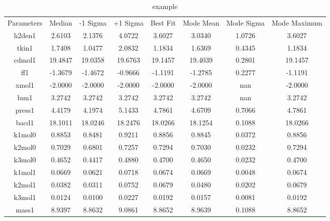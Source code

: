 \begin{table}
\caption{example}
\begin{tabular}{cccccccc}
Parameters & Median & -1 Sigma & +1 Sigma & Best Fit & Mode Mean & Mode Sigma & Mode Maximum \\
h2den1 & 2.6103 & 2.1376 & 4.0722 & 3.6027 & 3.0340 & 1.0726 & 3.6027 \\
tkin1 & 1.7408 & 1.0477 & 2.0832 & 1.1834 & 1.6369 & 0.4345 & 1.1834 \\
cdmol1 & 19.4847 & 19.0358 & 19.6763 & 19.1457 & 19.4039 & 0.2801 & 19.1457 \\
ff1 & -1.3679 & -1.4672 & -0.9666 & -1.1191 & -1.2785 & 0.2277 & -1.1191 \\
xmol1 & -2.0000 & -2.0000 & -2.0000 & -2.0000 & -2.0000 & nan & -2.0000 \\
lum1 & 3.2742 & 3.2742 & 3.2742 & 3.2742 & 3.2742 & nan & 3.2742 \\
press1 & 4.4179 & 4.1974 & 5.1433 & 4.7861 & 4.6709 & 0.7066 & 4.7861 \\
bacd1 & 18.1011 & 18.0246 & 18.2476 & 18.0266 & 18.1254 & 0.1088 & 18.0266 \\
k1mol0 & 0.8853 & 0.8481 & 0.9211 & 0.8856 & 0.8845 & 0.0372 & 0.8856 \\
k2mol0 & 0.7029 & 0.6801 & 0.7257 & 0.7294 & 0.7030 & 0.0232 & 0.7294 \\
k3mol0 & 0.4652 & 0.4417 & 0.4880 & 0.4700 & 0.4650 & 0.0232 & 0.4700 \\
k1mol1 & 0.0669 & 0.0621 & 0.0718 & 0.0674 & 0.0669 & 0.0048 & 0.0674 \\
k2mol1 & 0.0382 & 0.0311 & 0.0752 & 0.0679 & 0.0480 & 0.0202 & 0.0679 \\
k3mol1 & 0.0124 & 0.0100 & 0.0227 & 0.0192 & 0.0157 & 0.0081 & 0.0192 \\
mass1 & 8.9397 & 8.8632 & 9.0861 & 8.8652 & 8.9639 & 0.1088 & 8.8652 \\
\end{tabular}
\end{table}
